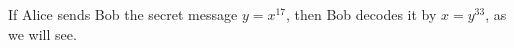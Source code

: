 \begin{example}
If Alice sends Bob the secret message \(y=x^{17}\), then Bob decodes it by \(x=y^{33}\), as we will see.
\end{example}
